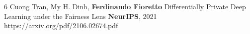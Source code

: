 \documentclass[localFont,alternative]{metadataShortBio}
\begin{document}
{\begin{pubs}
	\confentryShort
	{6} %
	{{Cuong Tran}, {My H. Dinh}, {\bf Ferdinando Fioretto}}
	{Differentially Private Deep Learning under the Fairness Lens}
	{\textbf{NeurIPS}, 2021}
	{https://arxiv.org/pdf/2106.02674.pdf}




\end{pubs}
}

\vspace{-2pt}
\vspace{-6pt}
\end{document}
